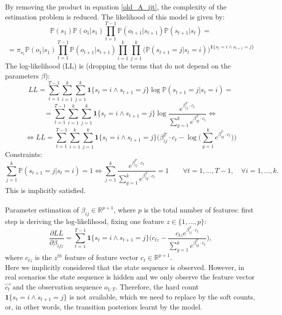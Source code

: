\documentclass{article}
\begin{document}
By removing the product in equation \eqref{old_A_ijt}, the complexity of the estimation problem is reduced. The likelihood of this model is given by:
\[\mathbb{P}(s_1)\mathbb{P}(o_1|s_1)\prod_{t=1}^{T-1} \mathbb{P}(o_{t+1}|s_{t+1}) \mathbb{P}(s_{t+1}|s_{t}) =\]
\[=\pi_{s_1}\mathbb{P}(o_1|s_1)\prod_{t=1}^{T-1} \mathbb{P}(o_{t+1}|s_{t+1}) \prod_{i=1}^k \prod_{j=1}^k \big(\mathbb{P}(s_{t+1}=j|s_{t}=i)\big)^{\textbf{1}\{s_{t}=i \wedge s_{t+1}=j\}}\]
The log-likelihood (LL) is (dropping the terms that do not depend on the parameters $\beta$):
\[LL = %
\sum_{t=1}^{T-1} \sum_{i=1}^k \sum_{j=1}^k \textbf{1}\{s_{t}=i\wedge s_{t+1}=j\} \log \mathbb{P}(s_{t+1}=j|s_{t}=i) = \]
\[=\sum_{t=1}^{T-1} \sum_{i=1}^k \sum_{j=1}^k \textbf{1}\{s_{t}=i\wedge s_{t+1}=j\} \log \dfrac{e^{\beta_{ij}^T \cdot c_t}}{\sum_{g=1}^k  e^{\beta_{ig}^T \cdot c_t}} \Longleftrightarrow\]
\begin{equation}
    \Longleftrightarrow LL = \sum_{t=1}^{T-1} \sum_{i=1}^k \sum_{j=1}^k \textbf{1}\{s_{t}=i\wedge s_{t+1}=j\} \Bigg (\beta_{ij}^T \cdot c_t - \log \Big (\sum_{g=1}^k e^{\beta_{ig}^T \cdot c_t}\Big) \Bigg)
    \label{log_likelihood}
\end{equation}
Constraints:
\[\sum_{j=1}^k \mathbb{P}(s_{t+1}=j|s_{t}=i) = 1 \Longleftrightarrow \sum_{j=1}^k \dfrac{e^{\beta_{ij}^T \cdot c_t}}{\sum_{g=1}^k  e^{\beta_{ig}^T \cdot c_t}} = 1 \qquad \forall t=1,...,T-1 , \quad \forall i=1,...,k.\]
This is implicitly satisfied.
\\ \\ \noindent
Parameter estimation of $\beta_{ij} \in \mathbb{R}^{p+1}$, where $p$ is the total number of features: first step is deriving the log-likelihood, fixing one feature $z\in\{1,...,p\}$:
\begin{equation}
    \dfrac{\partial LL}{\partial \beta_{ijz}} = \sum_{t=1}^{T-1} \textbf{1}\{s_{t}=i\wedge s_{t+1}=j\} \Bigg(c_{tz} - \dfrac{c_{tz}e^{\beta_{ij}^T \cdot c_t}}{\sum_{g=1}^k  e^{\beta_{ig}^T \cdot c_t}} \Bigg),
    \label{partial_bijz}
\end{equation}
where $c_{tz}$ is the $z^{th}$ feature of feature vector $c_t \in \mathbb{R}^{p+1}$. \\ \noindent
Here we implicitly considered that the state sequence is observed. However, in real scenarios the state sequence is hidden and we only observe the feature vector $\Vec{c_t}$ and the observation sequence $o_{1:T}$. Therefore, the hard count $\textbf{1}\{s_{t}=i\wedge s_{t+1}=j\}$ is not available, which we need to replace by the soft counts, or, in other words, the transition posteriors learnt by the model.
\end{document}
